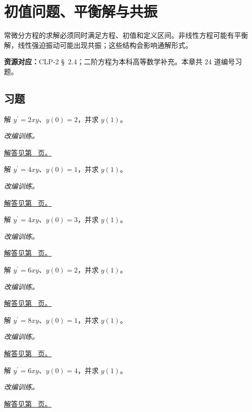 \documentclass[UTF8,12pt,a4paper,fontset=fandol]{ctexart}
\begin{document}
\clearpage
\section{初值问题、平衡解与共振}\label{sec:ch23}
常微分方程的求解必须同时满足方程、初值和定义区间。非线性方程可能有平衡解，线性强迫振动可能出现共振；这些结构会影响通解形式。

\textbf{资源对应：}CLP-2 \S~2.4；二阶方程为本科高等数学补充。本章共 24 道编号习题。
\subsection{习题}
\begin{example}[变量系数的可分离方程]\label{ex:c23q1}
解 $y^{\prime}=2xy$、$y(0)=2$，并求 $y(1)$。
\par\textit{改编训练。}\par\hyperref[ans:c23q1]{解答见第~\pageref{ans:c23q1} 页。}
\end{example}
\begin{example}[变量系数的可分离方程]\label{ex:c23q2}
解 $y^{\prime}=4xy$、$y(0)=1$，并求 $y(1)$。
\par\textit{改编训练。}\par\hyperref[ans:c23q2]{解答见第~\pageref{ans:c23q2} 页。}
\end{example}
\begin{example}[变量系数的可分离方程]\label{ex:c23q3}
解 $y^{\prime}=4xy$、$y(0)=3$，并求 $y(1)$。
\par\textit{改编训练。}\par\hyperref[ans:c23q3]{解答见第~\pageref{ans:c23q3} 页。}
\end{example}
\begin{example}[变量系数的可分离方程]\label{ex:c23q4}
解 $y^{\prime}=6xy$、$y(0)=2$，并求 $y(1)$。
\par\textit{改编训练。}\par\hyperref[ans:c23q4]{解答见第~\pageref{ans:c23q4} 页。}
\end{example}
\begin{example}[变量系数的可分离方程]\label{ex:c23q5}
解 $y^{\prime}=8xy$、$y(0)=1$，并求 $y(1)$。
\par\textit{改编训练。}\par\hyperref[ans:c23q5]{解答见第~\pageref{ans:c23q5} 页。}
\end{example}
\begin{example}[变量系数的可分离方程]\label{ex:c23q6}
解 $y^{\prime}=6xy$、$y(0)=4$，并求 $y(1)$。
\par\textit{改编训练。}\par\hyperref[ans:c23q6]{解答见第~\pageref{ans:c23q6} 页。}
\end{example}
\end{document}
